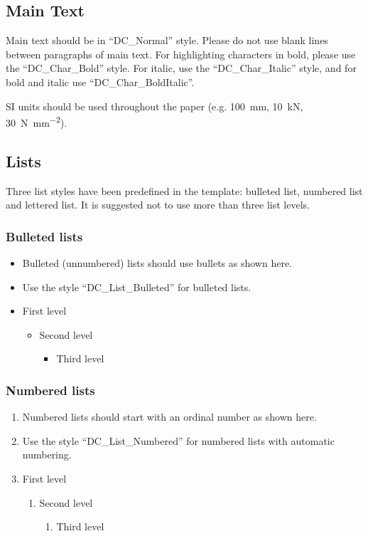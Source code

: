 \documentclass{design}
\begin{document}
\subsection{Main Text}

Main text should be in “DC\_Normal” style. Please do not use blank lines between paragraphs of main text. For highlighting characters in bold, please use the “DC\_Char\_Bold” style. For italic, use the “DC\_Char\_Italic” style, and for bold and italic use “DC\_Char\_BoldItalic”.

SI units should be used throughout the paper (e.g. \SI{100}{\milli\metre}, \SI{10}{\kilo\newton}, \SI{30}{\newton\per\milli\metre\squared}).

\subsection{Lists}

Three list styles have been predefined in the template: bulleted list, numbered list and lettered list. It is suggested not to use more than three list levels.

\subsubsection{Bulleted lists}

\begin{itemize}
    \item Bulleted (unnumbered) lists should use bullets as shown here.
    \item Use the style “DC\_List\_Bulleted” for bulleted lists.
    \item First level
    \begin{itemize}
        \item Second level
        \begin{itemize}
            \item Third level
        \end{itemize}
    \end{itemize}
\end{itemize}

\subsubsection{Numbered lists}

\begin{enumerate}
    \item Numbered lists should start with an ordinal number as shown here.
    \item Use the style “DC\_List\_Numbered” for numbered lists with automatic numbering.
    \item First level
    \begin{enumerate}
        \item Second level
        \begin{enumerate}
            \item Third level
        \end{enumerate}
    \end{enumerate}
\end{enumerate}
\end{document}
